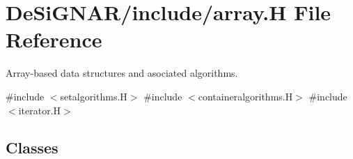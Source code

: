 \hypertarget{array_8_h}{}\section{De\+Si\+G\+N\+A\+R/include/array.H File Reference}
\label{array_8_h}


Array-\/based data structures and asociated algorithms.  


{\ttfamily \#include $<$setalgorithms.\+H$>$}\newline
{\ttfamily \#include $<$containeralgorithms.\+H$>$}\newline
{\ttfamily \#include $<$iterator.\+H$>$}\newline
\subsection*{Classes}
